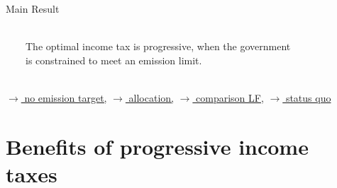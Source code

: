 \documentclass[11pt,aspectratio=169]{beamer}
\begin{document}
\begin{frame}{Main Result}
\begin{minipage}[]{0.32\textwidth}
\end{minipage}
\vspace{5mm}
\begin{block}{}
	\ \\
	\ \ \ \  The optimal income tax is progressive, when the government  \\ \ \ \ \ is constrained to meet an emission limit. \  \ \\ \ 
\end{block}
	\vspace{-2mm}
\hfill
\hyperlink{notopt}{\tiny{$\rightarrow$ no emission target,}} 
\hyperlink{alloc}{\tiny{$\rightarrow$ allocation,}} 
\hyperlink{allocLF}{\tiny{$\rightarrow$ comparison LF,}} 
\hyperlink{sq}{\tiny{$\rightarrow$ status quo}} 
\hypertarget{backmainres}{}
\end{frame}




\hypertarget{benf}{}
\section*{Benefits of progressive income taxes}
\end{document}
